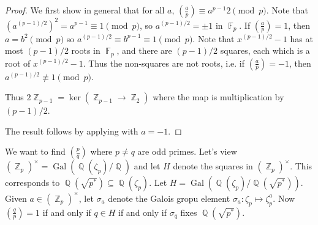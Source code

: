 \documentclass[11pt, a4paper]{memoir}
\DeclareMathOperator{\Q}{{\mathbb{Q}}}
\DeclareMathOperator{\Z}{{\mathbb{Z}}}
\DeclareMathOperator{\F}{{\mathbb{F}}}
\theoremstyle{change}
\theoremstyle{plain}
\theoremstyle{nonumberplain}
\newtheorem{proof}{Proof}
\DeclareMathOperator{\Gal}{Gal}
\newcommand{\lgs}[2]{\ensuremath{\left(\frac{#1}{#2}\right)}}
\numberwithin{equation}{section}
\begin{document}
\begin{proof}
    We first show in general that for all $a$, $\lgs{a}{p}\equiv a^{p-1}{2}\pmod{p}$.
    Note that $\left(a^{(p-1)/2}\right)^2=a^{p-1}\equiv 1\pmod{p}$, so $a^{(p-1)/2}=\pm 1$ in $\F_p$.
    If $\lgs{a}{p}=1$, then $a=b^2\pmod{p}$ so $a^{(p-1)/2}\equiv b^{p-1}\equiv 1\pmod{p}$.
    Note that $x^{(p-1)/2}-1$ has at most $(p-1)/2$ roots in $\F_p$, and there are $(p-1)/2$ squares, each which is a root of $x^{(p-1)/2}-1$.
    Thus the non-squares are not roots, i.e. if $\lgs{a}{p}=-1$, then $a^{(p-1)/2}\nequiv 1\pmod{p}$.
    \begin{center}
    \end{center}
    Thus $2\Z_{p-1}=\ker(\Z_{p-1}\to\Z_2)$ where the map is multiplication by $(p-1)/2$.

    The result follows by applying with $a=-1$.
\end{proof}
We want to find $\lgs{p}{q}$ where $p\neq q$ are odd primes.
Let's view $(\Z_p)^\times=\Gal(\Q(\zeta_p)/\Q)$ and let $H$ denote the squares in $(\Z_p)^\times$.
This corresponds to $\Q(\sqrt{p^*})\subseteq\Q(\zeta_p)$.
Let $H=\Gal(\Q(\zeta_p)/\Q(\sqrt{p^*}))$.
Given $a\in(\Z_p)^\times$, let $\sigma_a$ denote the Galois gropu element $\sigma_a:\zeta_p\mapsto\zeta_p^a$.
Now $\lgs{q}{p}=1$ if and only if $q\in H$ if and only if $\sigma_q$ fixes $\Q(\sqrt{p^*})$.
\end{document}

